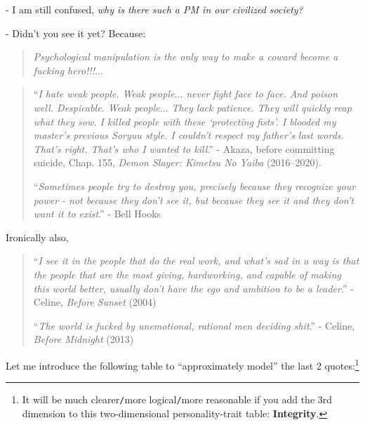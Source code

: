 \documentclass[12pt]{article}
\numberwithin{equation}{section}
\begin{document}
- I am still confused, \textit{why is there such a PM in our civilized society?}

- Didn't you see it yet? Because:
\begin{quotation}
    \textit{Psychological manipulation is the only way to make a coward become a fucking hero!!!}$\ldots$
\end{quotation}

\begin{quotation}
    ``\textit{I hate weak people. Weak people$\ldots$ never fight face to face. And poison well. Despicable. Weak people$\ldots$ They lack patience. They will quickly reap what they sow. I killed people with these `protecting fists'. I blooded my master's previous Soryuu style. I couldn't respect my father's last words. That's right. That's who I wanted to kill}.'' - Akaza, before committing suicide, Chap. 155, \textit{Demon Slayer: Kimetsu No Yaiba} (2016--2020).
    
    ``\textit{Sometimes people try to destroy you, precisely because they recognize your power - not because they don't see it, but because they see it and they don't want it to exist}.'' - Bell Hooks
\end{quotation}
Ironically also,

\begin{quotation}
    ``\textit{I see it in the people that do the real work, and what's sad in a way is that the people that are the most giving, hardworking, and capable of making this world better, usually don't have the ego and ambition to be a leader}.'' - Celine, \textit{Before Sunset} (2004)
    
    ``\textit{The world is fucked by unemotional, rational men deciding shit}.'' - Celine, \textit{Before Midnight} (2013)
\end{quotation}
Let me introduce the following table to ``approximately model'' the last 2 quotes:\footnote{It will be much clearer\texttt{/}more logical\texttt{/}more reasonable if you add the 3rd dimension to this two-dimensional personality-trait table: \textbf{Integrity}.}
\end{document}
